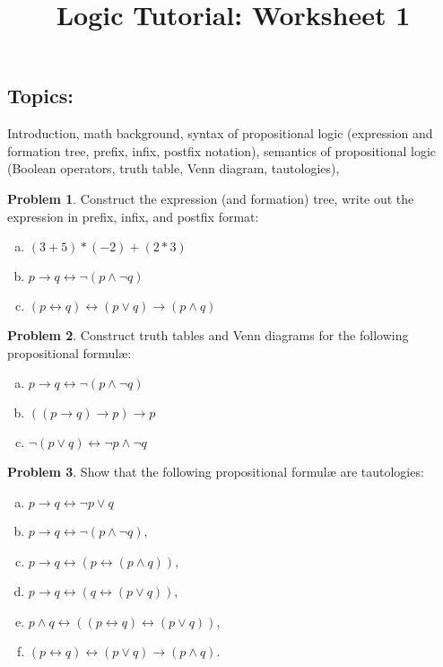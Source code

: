 \documentclass{amsart}
\title{\sc Logic Tutorial: Worksheet 1}
\date{}
\theoremstyle{definition}
\newtheorem{problem}{Problem}
\begin{document}
\maketitle


\subsection*{Topics:} Introduction, math background, syntax of propositional logic (expression and formation tree, prefix, infix, postfix notation), semantics of propositional logic (Boolean operators, truth table, Venn diagram, tautologies), 

\smallskip
\begin{problem}
Construct the expression (and formation) tree, write out the expression in prefix, infix, and postfix format:
\begin{enumerate}[(a)]
    \item $(3+5)*(-2)+(2*3)$
    \item $p \to q \leftrightarrow \neg (p \wedge \neg q)$
    \item $(p \leftrightarrow q) \leftrightarrow (p \vee q) \to (p \wedge q)$
\end{enumerate}
\end{problem}


\smallskip
\begin{problem}
Construct truth tables and Venn diagrams for the following propositional formul\ae:
\begin{enumerate}[(a)]
\item $p \to q \leftrightarrow \neg (p \wedge \neg q)$
\item $((p\to q)\to p)\to p$
\item $\neg (p\vee q)\leftrightarrow \neg p\wedge \neg q$
\end{enumerate}
\end{problem}


\smallskip
\begin{problem}
Show that the following propositional formul{\ae} are tautologies:
\begin{enumerate}[(a)]
    \item $p \to q \leftrightarrow \neg p \vee q$
    \item $p \to q \leftrightarrow \neg (p \wedge \neg q)$,
    \item $p \to q \leftrightarrow (p \leftrightarrow (p\wedge q))$,
    \item $p \to q \leftrightarrow (q \leftrightarrow (p\vee q))$,
    \item $p \wedge q \leftrightarrow ((p \leftrightarrow q) \leftrightarrow (p \vee q))$,
    \item $(p \leftrightarrow q) \leftrightarrow (p \vee q) \to (p \wedge q)$.
\end{enumerate}
\end{problem}
\end{document}
